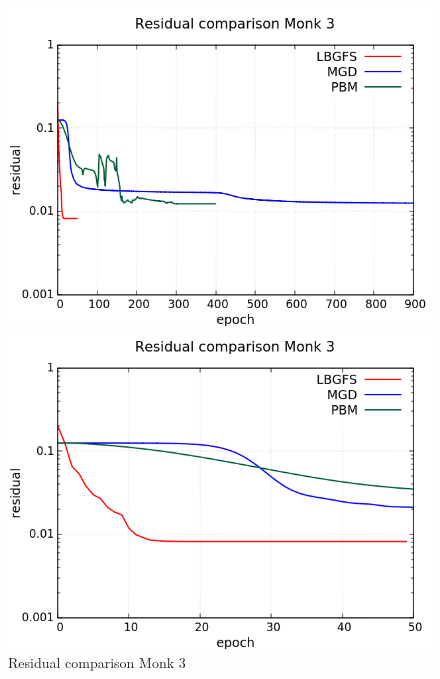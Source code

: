 \begin{figure}[H]
	\centering
	\begin{minipage}[t]{0.5\linewidth}
		\includegraphics[width=\linewidth]{data/Comparison/Monk3/Monk3_R_Comparison_log_standard.png}
	\end{minipage}%
	\begin{minipage}[t]{0.5\linewidth}
		\includegraphics[width=\linewidth]{data/Comparison/Monk3/Monk3_R_Comparison_log_zoom.png}
	\end{minipage}
	\caption{Residual comparison Monk 3}
	\label{R-Monk3}
\end{figure}
